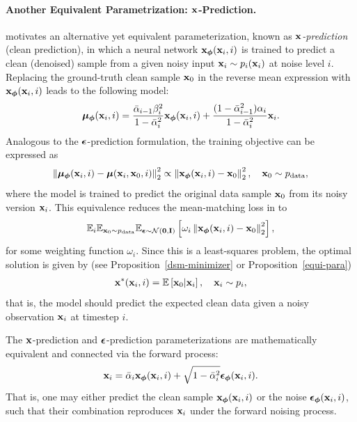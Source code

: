 \paragraph{Another Equivalent Parametrization: ${\mathbf{x}}$-Prediction.} 
 motivates an alternative yet equivalent parameterization, known as \emph{${\mathbf{x}}$-prediction} (clean prediction), in which a neural network ${\mathbf{x}}_{\bm{\phi}}({\mathbf{x}}_i, i)$ is trained to predict a clean (denoised) sample from a given noisy input ${\mathbf{x}}_i \sim p_i({\mathbf{x}}_i)$ at noise level $i$. Replacing the ground-truth clean sample ${\mathbf{x}}_0$ in the reverse mean expression with ${\mathbf{x}}_{\bm{\phi}}({\mathbf{x}}_i, i)$ leads to the following model:
\begin{align*}
\bm{\mu}_{\bm{\phi}}({\mathbf{x}}_i, i) = \frac{\bar{\alpha}_{i-1} \beta_i^2}{1 - \bar{\alpha}_i^2} {\mathbf{x}}_{\bm{\phi}}({\mathbf{x}}_i, i) + \frac{(1 - \bar{\alpha}_{i-1}^2)\alpha_i}{1 - \bar{\alpha}_i^2} {\mathbf{x}}_i.
\end{align*}
Analogous to the ${\bm{\epsilon}}$-prediction formulation, the training objective can be expressed as
\[
\left\| \bm{\mu}_{\bm{\phi}}({\mathbf{x}}_i, i) - \bm{\mu}({\mathbf{x}}_i, {\mathbf{x}}_0, i) \right\|_2^2 \propto \left\| {\mathbf{x}}_{\bm{\phi}}({\mathbf{x}}_i, i) - {\mathbf{x}}_0 \right\|_2^2, \quad {\mathbf{x}}_0 \sim p_{\text{data}},
\]
where the model is trained to predict the original data sample ${\mathbf{x}}_0$ from its noisy version ${\mathbf{x}}_i$. This equivalence reduces the mean-matching loss in  to
\[
\mathbb{E}_{i} \mathbb{E}_{{\mathbf{x}}_0 \sim p_{\text{data}}} \mathbb{E}_{\boldsymbol{\epsilon} \sim \mathcal{N}(\mathbf{0}, \mathbf{I})} \left[\omega_i \left\| {\mathbf{x}}_{\bm{\phi}}({\mathbf{x}}_i, i) - {\mathbf{x}}_0 \right\|_2^2 \right],
\]
for some weighting function $\omega_i$. Since this is a least-squares problem, the optimal solution is given by (see Proposition~\ref{dsm-minimizer} or Proposition~\ref{equi-para}) 
\begin{align}\label{eq:ddpm-clean-minimizer}
    {\mathbf{x}}^*({\mathbf{x}}_i, i) = \mathbb{E}\left[ {\mathbf{x}}_0|{\mathbf{x}}_i \right], \quad {\mathbf{x}}_i \sim p_i,
\end{align}
that is, the model should predict the expected clean data given a noisy observation ${\mathbf{x}}_i$ at timestep $i$.

The ${\mathbf{x}}$-prediction and ${\bm{\epsilon}}$-prediction parameterizations are mathematically equivalent and connected via the forward process:
\begin{equation}\label{eq:ddpm-clean-noise}
    {\mathbf{x}}_i = \bar{\alpha}_i {\mathbf{x}}_{\bm{\phi}}({\mathbf{x}}_i, i) + \sqrt{1 - \bar{\alpha}_i^2}   \boldsymbol{\epsilon}_{\bm{\phi}}({\mathbf{x}}_i, i).
\end{equation}
That is, one may either predict the clean sample ${\mathbf{x}}_{\bm{\phi}}({\mathbf{x}}_i, i)$ or the noise $\boldsymbol{\epsilon}_{\bm{\phi}}({\mathbf{x}}_i, i)$, such that their combination reproduces ${\mathbf{x}}_i$ under the forward noising process. 




